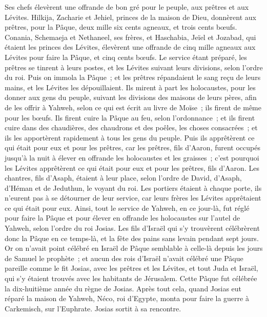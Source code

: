 \begin{multicols}{2}
Ses chefs élevèrent une offrande de bon gré pour le peuple, aux prêtres et aux Lévites. Hilkija, Zacharie et Jehiel, princes de la maison de Dieu, donnèrent aux prêtres, pour la Pâque, deux mille six cents agneaux, et trois cents bœufs.
Conania, Schemaeja et Nethaneel, ses frères, et Haschabia, Jeïel et Jozabad, qui étaient les princes des Lévites, élevèrent une offrande de cinq mille agneaux aux Lévites pour faire la Pâque, et cinq cents bœufs.
Le service étant préparé, les prêtres se tinrent à leurs postes, et les Lévites suivant leurs divisions, selon l'ordre du roi.
Puis on immola la Pâque~; et les prêtres répandaient le sang reçu de leurs mains, et les Lévites les dépouillaient.
Ils mirent à part les holocaustes, pour les donner aux gens du peuple, suivant les divisions des maisons de leurs pères, afin de les offrir à Yahweh, selon ce qui est écrit au livre de Moïse~; ils firent de même pour les bœufs.
Ils firent cuire la Pâque au feu, selon l'ordonnance~; et ils firent cuire dans des chaudières, des chaudrons et des poêles, les choses consacrées~; et ils les apportèrent rapidement à tous les gens du peuple.
Puis ils apprêtèrent ce qui était pour eux et pour les prêtres, car les prêtres, fils d'Aaron, furent occupés jusqu'à la nuit à élever en offrande les holocaustes et les graisses~; c'est pourquoi les Lévites apprêtèrent ce qui était pour eux et pour les prêtres, fils d'Aaron.
Les chantres, fils d'Asaph, étaient à leur place, selon l'ordre de David, d'Asaph, d'Héman et de Jeduthun, le voyant du roi. Les portiers étaient à chaque porte, ils n'eurent pas à se détourner de leur service, car leurs frères les Lévites apprêtaient ce qui était pour eux.
Ainsi, tout le service de Yahweh, en ce jour-là, fut réglé pour faire la Pâque et pour élever en offrande les holocaustes sur l'autel de Yahweh, selon l'ordre du roi Josias.
Les fils d'Israël qui s'y trouvèrent célébrèrent donc la Pâque en ce temps-là, et la fête des pains sans levain pendant sept jours.
Or on n'avait point célébré en Israël de Pâque semblable à celle-là depuis les jours de Samuel le prophète~; et aucun des rois d'Israël n'avait célébré une Pâque pareille comme le fit Josias, avec les prêtres et les Lévites, et tout Juda et Israël, qui s'y étaient trouvés avec les habitants de Jérusalem.
Cette Pâque fut célébrée la dix-huitième année du règne de Josias.
Après tout cela, quand Josias eut réparé la maison de Yahweh, Néco, roi d'Egypte, monta pour faire la guerre à Carkemisch, sur l'Euphrate. Josias sortit à sa rencontre.

\end{multicols}
